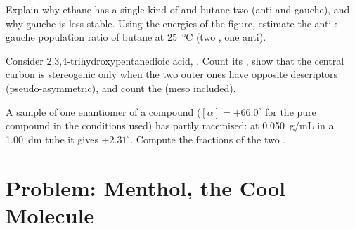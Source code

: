 \begin{exercise}[$\star\star\star$]\label{exo:b1:stereochemistry-in-depth:10}
Explain why ethane has a single kind of  and
butane two (anti and gauche), and why gauche is less stable. Using the
energies of the figure, estimate the anti : gauche population ratio of
butane at \qty{25}{\celsius} (two , one anti).
\end{exercise}

\begin{exercise}[$\star\star\star$]\label{exo:b1:stereochemistry-in-depth:11}
Consider 2,3,4-trihydroxypentanedioic acid,
. Count its , show
that the central carbon is stereogenic only when the two outer ones have
opposite descriptors (pseudo-asymmetric), and count the 
(meso included).
\end{exercise}

\begin{exercise}[$\star\star\star$]\label{exo:b1:stereochemistry-in-depth:12}
A sample of one enantiomer of a compound ($[\alpha] = +66.0^\circ$ for the
pure compound in the conditions used) has partly racemised: at
\qty{0.050}{g/mL} in a \qty{1.00}{dm} tube it gives $+2.31^\circ$.
Compute the fractions of the two .
\end{exercise}

\section{Problem: Menthol, the Cool Molecule}

